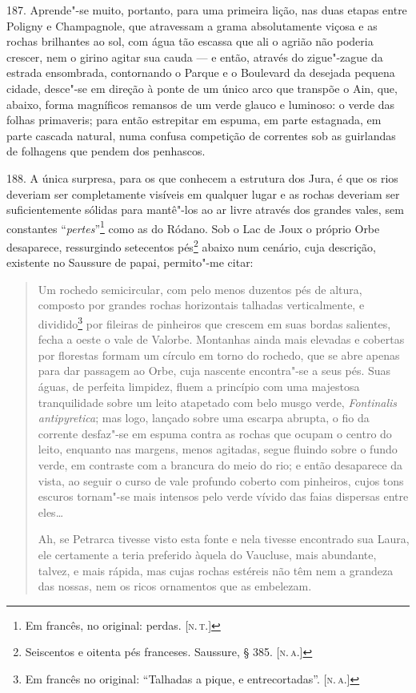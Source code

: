 187. Aprende"-se muito, portanto, para uma primeira lição, nas duas
etapas entre Poligny e Champagnole, que atravessam a grama absolutamente
viçosa e as rochas brilhantes ao sol, com água tão escassa que ali o
agrião não poderia crescer, nem o girino agitar sua cauda --- e então,
através do zigue"-zague da estrada ensombrada, contornando o Parque e o
Boulevard da desejada pequena cidade, desce"-se em direção à ponte de um
único arco que transpõe o Ain, que, abaixo, forma magníficos remansos de
um verde glauco e luminoso: o verde das folhas primaveris; para então
estrepitar em espuma, em parte estagnada, em parte cascada natural, numa
confusa competição de correntes sob as guirlandas de folhagens que
pendem dos penhascos.

188. A única surpresa, para os que conhecem a estrutura dos Jura, é que
os rios deveriam ser completamente visíveis em qualquer lugar e as
rochas deveriam ser suficientemente sólidas para mantê"-los ao ar livre
através dos grandes vales, sem constantes ``\emph{pertes}''\footnote{Em
  francês, no original: perdas. {[}\textsc{n.\,t.}{]}} como as do Ródano. Sob o
Lac de Joux o próprio Orbe desaparece, ressurgindo setecentos
pés\footnote{Seiscentos e oitenta pés franceses. Saussure, § 385. {[}\textsc{n.\,a.}{]}} abaixo num cenário, cuja descrição, existente no Saussure
de papai, permito"-me citar:

\begin{quote}
Um rochedo semicircular, com pelo menos duzentos pés de altura,
composto por grandes rochas horizontais talhadas verticalmente, e
dividido\footnote{Em francês no original: ``Talhadas a pique, e
  entrecortadas''. {[}\textsc{n.\,a.}{]}} por fileiras de pinheiros que crescem
em suas bordas salientes, fecha a oeste o vale de Valorbe. Montanhas
ainda mais elevadas e cobertas por florestas formam um círculo em torno
do rochedo, que se abre apenas para dar passagem ao Orbe, cuja nascente
encontra"-se a seus pés. Suas águas, de perfeita limpidez, fluem a
princípio com uma majestosa tranquilidade sobre um leito atapetado com
belo musgo verde, \emph{Fontinalis antipyretica}; mas logo, lançado
sobre uma escarpa abrupta, o fio da corrente desfaz"-se em espuma contra
as rochas que ocupam o centro do leito, enquanto nas margens, menos
agitadas, segue fluindo sobre o fundo verde, em contraste com a brancura
do meio do rio; e então desaparece da vista, ao seguir o curso de vale
profundo coberto com pinheiros, cujos tons escuros tornam"-se mais
intensos pelo verde vívido das faias dispersas entre eles\ldots{}

Ah, se Petrarca tivesse visto esta fonte e nela tivesse encontrado sua
Laura, ele certamente a teria preferido àquela do Vaucluse, mais
abundante, talvez, e mais rápida, mas cujas rochas estéreis não têm nem
a grandeza das nossas, nem os ricos ornamentos que as embelezam.
\end{quote}

